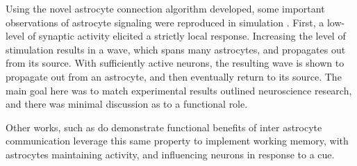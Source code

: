     Using the novel astrocyte connection algorithm developed, some important
    observations of astrocyte signaling were reproduced in simulation
    \parencite{postnov_2009}. First, a low-level of synaptic activity elicited a
    strictly local response. Increasing the level of stimulation results in a
    \ca wave, which spans many astrocytes, and propagates out from its
    source. With sufficiently active neurons, the resulting \ca wave is shown to
    propagate out from an astrocyte, and then eventually return to its
    source. The main goal here was to match experimental results outlined
    neuroscience research, and there was minimal discussion as to a functional
    role.

    Other works, such as \parencite{gordleeva_2021} do demonstrate functional
    benefits of inter astrocyte communication leverage this same property to
    implement working memory, with astrocytes maintaining \ca activity, and
    influencing neurons in response to a cue.

    
    
    
